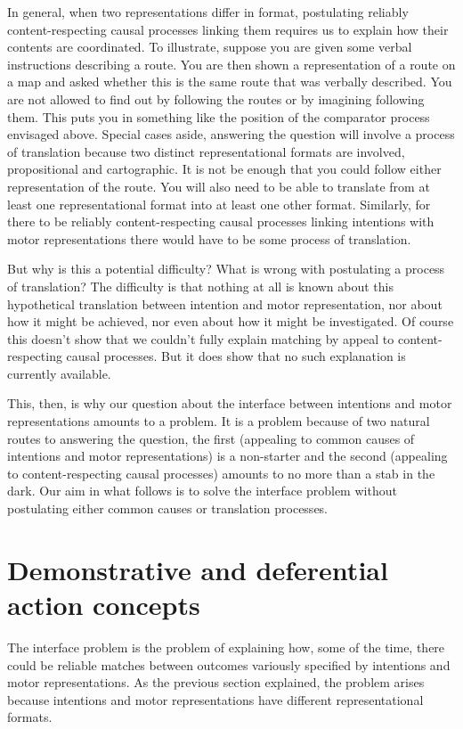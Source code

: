 \documentclass[12pt,\papersize]{extarticle}
\begin{document}
In general, when two representations differ in format, postulating reliably content-respecting causal processes linking them requires us to explain how their contents are coordinated. To illustrate, suppose you are given some verbal instructions describing a route. You are then shown a representation of a route on a map and asked whether this is the same route that was verbally described. You are not allowed to find out by following the routes or by imagining following them. This puts you in something like the position of the comparator process envisaged above. Special cases aside, answering the question will involve a process of translation because two distinct representational formats are involved, propositional and cartographic. It is not be enough that you could follow either representation of the route. You will also need to be able to translate from at least one representational format into at least one other format. Similarly, for there to be reliably content-respecting causal processes linking intentions with motor representations there would have to be some process of translation.

But why is this a potential difficulty? What is wrong with postulating a process of translation? The difficulty is that nothing at all is known about this hypothetical translation between intention and motor representation, nor about how it might be achieved, nor even about how it might be investigated. Of course this doesn't show that we couldn't fully explain matching by appeal to content-respecting causal processes. But it does show that no such explanation is currently available.  

This, then, is why our question about the interface between intentions and motor representations amounts to a problem. It is a problem because of two natural routes to answering the question, the first (appealing to common causes of intentions and motor representations) is a non-starter and the second (appealing to content-respecting causal processes) amounts to no more than a stab in the dark.  Our aim in what follows is to solve the interface problem without postulating either common causes or translation processes.

\section{Demonstrative and deferential action concepts}

The interface problem is the problem of explaining how, some of the time, there could be reliable matches between outcomes variously specified by intentions and motor representations. As the previous section explained, the problem arises because intentions and motor representations have different representational formats.
\end{document}
